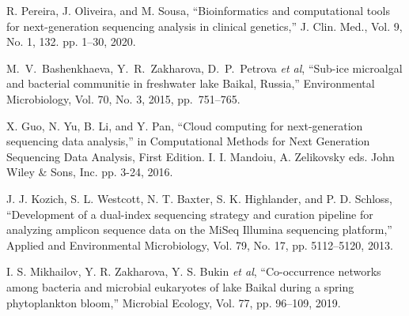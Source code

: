 \documentclass[a4paper]{jpconf}
\begin{document}
\begin{thebibliography}{0}

 R. Pereira, J. Oliveira, and M. Sousa, ``Bioinformatics and computational tools for next-generation sequencing analysis in clinical genetics,'' J. Clin. Med., Vol. 9, No. 1, 132. pp. 1--30, 2020. 

 M.~V.~Bashenkhaeva, Y.~R.~Zakharova, D.~P.~Petrova \emph{et al}, ``Sub-ice microalgal and bacterial communitie in freshwater lake Baikal, Russia,'' Environmental Microbiology, Vol. 70, No. 3, 2015, pp.~751--765. 

 X. Guo, N. Yu, B. Li, and Y. Pan, ``Cloud computing for next-generation sequencing data analysis,'' in Computational Methods for Next Generation Sequencing Data Analysis, First Edition. I. I. Mandoiu, A. Zelikovsky eds. John Wiley \& Sons, Inc. pp. 3-24, 2016. \doi{}

 J. J. Kozich, S. L. Westcott, N. T. Baxter, S. K. Highlander, and P. D. Schloss, ``Development of a dual-index sequencing strategy and curation pipeline for analyzing amplicon sequence data on the MiSeq Illumina sequencing platform,'' Applied and Environmental Microbiology, Vol. 79, No. 17, pp. 5112–5120, 2013.

 I. S. Mikhailov, Y. R. Zakharova, Y. S. Bukin \emph{et al}, ``Co-occurrence networks among bacteria and microbial eukaryotes of lake Baikal during a spring phytoplankton bloom,'' Microbial Ecology, Vol. 77, pp. 96–109, 2019. 





\end{thebibliography}
\end{document}
